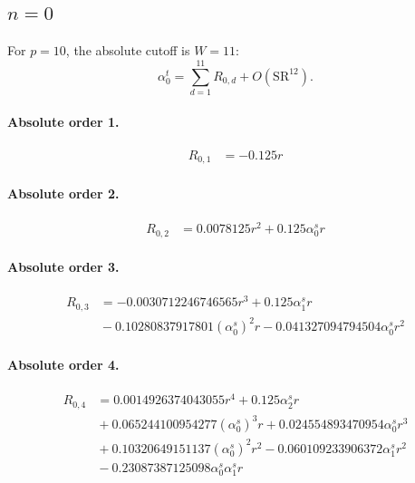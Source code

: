 \documentclass[10pt]{article}
\begin{document}
\subsection{$n=0$}
For $p=10$, the absolute cutoff is $W=11$:
\[\alpha_{0}^t=\sum_{d=1}^{11}R_{0,d}+O(\mathrm{SR}^{12}).\]
\paragraph{Absolute order 1.}
\begin{align*}
R_{0,1} &=  - 0.125 r
\end{align*}

\paragraph{Absolute order 2.}
\begin{align*}
R_{0,2} &= 0.0078125 r^{2} + 0.125 \alpha_{0}^s r
\end{align*}

\paragraph{Absolute order 3.}
\begin{align*}
R_{0,3} &=  - 0.0030712246746565 r^{3} + 0.125 \alpha_{1}^s r \\
&{}  - 0.10280837917801 \left(\alpha_{0}^s\right)^{2} r - 0.041327094794504 \alpha_{0}^s r^{2}
\end{align*}

\paragraph{Absolute order 4.}
\begin{align*}
R_{0,4} &= 0.0014926374043055 r^{4} + 0.125 \alpha_{2}^s r \\
&{}  + 0.065244100954277 \left(\alpha_{0}^s\right)^{3} r + 0.024554893470954 \alpha_{0}^s r^{3} \\
&{}  + 0.10320649151137 \left(\alpha_{0}^s\right)^{2} r^{2} - 0.060109233906372 \alpha_{1}^s r^{2} \\
&{}  - 0.23087387125098 \alpha_{0}^s \alpha_{1}^s r
\end{align*}
\end{document}
